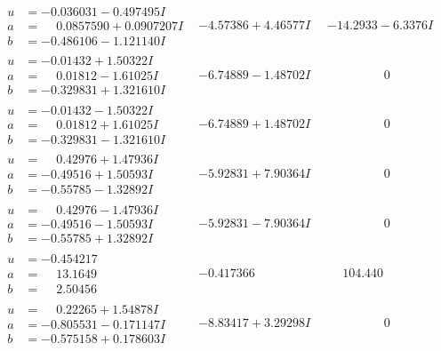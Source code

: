 \documentclass[1p]{elsarticle_modified}
\theoremstyle{definition}
\begin{document}
$$\begin{array}{c|c|c}
\begin{aligned}
u &= -0.036031 - 0.497495 I \\
a &= \phantom{-}0.0857590 + 0.0907207 I \\
b &= -0.486106 - 1.121140 I\end{aligned}
 & -4.57386 + 4.46577 I & -14.2933 - 6.3376 I \\ \hline\begin{aligned}
u &= -0.01432 + 1.50322 I \\
a &= \phantom{-}0.01812 - 1.61025 I \\
b &= -0.329831 + 1.321610 I\end{aligned}
 & -6.74889 - 1.48702 I & \phantom{-0.000000 } 0 \\ \hline\begin{aligned}
u &= -0.01432 - 1.50322 I \\
a &= \phantom{-}0.01812 + 1.61025 I \\
b &= -0.329831 - 1.321610 I\end{aligned}
 & -6.74889 + 1.48702 I & \phantom{-0.000000 } 0 \\ \hline\begin{aligned}
u &= \phantom{-}0.42976 + 1.47936 I \\
a &= -0.49516 + 1.50593 I \\
b &= -0.55785 - 1.32892 I\end{aligned}
 & -5.92831 + 7.90364 I & \phantom{-0.000000 } 0 \\ \hline\begin{aligned}
u &= \phantom{-}0.42976 - 1.47936 I \\
a &= -0.49516 - 1.50593 I \\
b &= -0.55785 + 1.32892 I\end{aligned}
 & -5.92831 - 7.90364 I & \phantom{-0.000000 } 0 \\ \hline\begin{aligned}
u &= -0.454217\phantom{ +0.000000I} \\
a &= \phantom{-}13.1649\phantom{ +0.000000I} \\
b &= \phantom{-}2.50456\phantom{ +0.000000I}\end{aligned}
 & -0.417366\phantom{ +0.000000I} & \phantom{-}104.440\phantom{ +0.000000I} \\ \hline\begin{aligned}
u &= \phantom{-}0.22265 + 1.54878 I \\
a &= -0.805531 - 0.171147 I \\
b &= -0.575158 + 0.178603 I\end{aligned}
 & -8.83417 + 3.29298 I & \phantom{-0.000000 } 0 \\ \hline\begin{aligned}

\end{aligned}
\end{array}$$
\end{document}
